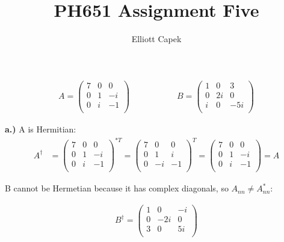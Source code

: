 \documentclass[10pt]{article} %
\title{PH651 Assignment Five}
\author{Elliott Capek}
\begin{document}
\maketitle{}

\begin{align*}
  A =
  \begin{pmatrix}
    7 & 0 & 0\\
    0 & 1 & -i\\
    0 & i & -1\\
  \end{pmatrix}
  \hspace{2cm}
  &
  B =
  \begin{pmatrix}
    1 & 0 & 3\\
    0 & 2i & 0\\
    i & 0 & -5i\\
  \end{pmatrix}
\end{align*}

\textbf{a.)}
A is Hermitian:
\begin{align*}
  A^\dagger &=
  \begin{pmatrix}
    7 & 0 & 0\\
    0 & 1 & -i\\
    0 & i & -1\\
  \end{pmatrix}^{*T}
  =
  \begin{pmatrix}
    7 & 0 & 0\\
    0 & 1 & i\\
    0 & -i & -1\\
  \end{pmatrix}^{T}
  =
  \begin{pmatrix}
    7 & 0 & 0\\
    0 & 1 & -i\\
    0 & i & -1\\
  \end{pmatrix}
  = A
\end{align*}

B cannot be Hermetian because it has complex diagonals, so $A_{nn} \neq A_{nn}^*$:

\begin{align*}
  B^\dagger = 
  \begin{pmatrix}
    1 & 0 & -i\\
    0 & -2i & 0\\
    3 & 0 & 5i\\
  \end{pmatrix}
\end{align*}
\end{document}
